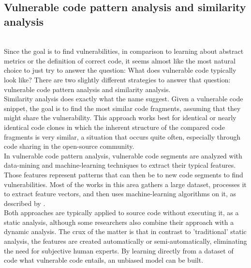 \documentclass[
	a4paper,
	pagesize,
	pdftex,
	12pt,
	twoside, %
	BCOR=5mm, %
	ngerman,
	fleqn,
	final,
	]{scrartcl}
\begin{document}
\subsection{Vulnerable code pattern analysis and similarity analysis}\mbox{}\\
Since the goal is to find vulnerabilities, in comparison to learning about abstract metrics or the definition of correct code, it seems almost like the most natural choice to just try to answer the question: What does vulnerable code typically look like? There are two slightly different strategies to answer that question: vulnerable code pattern analysis and similarity analysis.\\
Similarity analysis does exactly what the name suggest. Given a vulnerable code snippet, the goal is to find the most similar code fragments, assuming that they might share the vulnerability. This approach works best for identical or nearly identical code clones in which the inherent structure of the compared code fragments is very similar\cite{Li.2018}, a situation that occurs quite often, especially through code sharing in the open-source community.\\
In vulnerable code pattern analysis, vulnerable code segments are analyzed with data-mining and machine-learning techniques to extract their typical features. Those features represent patterns that can then be to new code segments to find vulnerabilities. Most of the works in this area gathers a large dataset, processes it to extract feature vectors, and then uses machine-learning algorithms on it, as described by \citep{Ghaffarian.2017}.\\
Both approaches are typically applied to source code without executing it, as a static analysis, although some researchers also combine their approach with a dynamic analysis. The crux of the matter is that in contrast to 'traditional' static analysis, the features are created automatically or semi-automatically, eliminating the need for subjective human experts. By learning directly from a dataset of code what vulnerable code entails, an unbiased model can be built.\\
\end{document}
